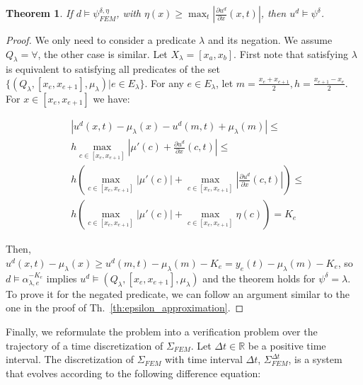 \documentclass{article}
\newtheorem{theorem}{Theorem}
\newcommand*{\R}{\mathbb{R}}
\begin{document}
\begin{theorem}
\label{th:eta_approximation}
    If $d \models \psi^{\delta, \eta}_{FEM}$, with $\eta(x) \geq \max_t |\frac{\partial
    u^d}{\partial x}(x, t)|$, then $u^d \models \psi^\delta$.
\end{theorem}
\begin{proof}
    We only need to consider a predicate $\lambda$ and its negation. We assume
    $Q_\lambda = \forall$, the other case is similar. Let $X_\lambda = [x_a,
    x_b]$. First note that satisfying $\lambda$ is equivalent to satisfying all
    predicates of the set $\{(Q_\lambda, [x_e, x_{e+1}], \mu_\lambda) | e \in
    E_\lambda\}$. For any $e \in E_\lambda$, let $m = \frac{x_e + x_{e+1}}{2}, 
    h = \frac{x_{e+1} - x_{e}}{2}$. 
    For $x \in [x_e, x_{e+1}]$ we have:

    \begin{equation}
    \begin{aligned}
        &|u^d(x, t) - \mu_\lambda(x) - u^d(m, t) + \mu_\lambda(m)| \leq \\
        &h \max_{c \in [x_e, x_{e+1}]} 
        |\mu'(c) + \frac{\partial u^d}{\partial x}(c, t)|
        \leq \\
        &h \left (  
        \max_{c \in [x_e, x_{e+1}]} |\mu'(c)| +
        \max_{c \in [x_e, x_{e+1}]} |\frac{\partial u^d}{\partial x}(c, t)|
        \right ) \leq \\
        &h \left (  
        \max_{c \in [x_e, x_{e+1}]} |\mu'(c)| +
        \max_{c \in [x_e, x_{e+1}]} \eta(c)
        \right )  = K_e
    \end{aligned}
    \end{equation}

    Then, $u^d(x, t) - \mu_\lambda(x) \geq u^d(m, t) - \mu_\lambda(m) - K_e =
    y_e(t) - \mu_\lambda(m) - K_e$, so $d \models \alpha^{-K_e}_{\lambda, e}$
    implies $u^d \models (Q_\lambda, [x_e, x_{e+1}], \mu_\lambda)$ and the
    theorem holds for $\psi^\delta = \lambda$. To prove it for the negated
    predicate, we can follow an argument similar to the one in the proof of
    Th.~\ref{th:epsilon_approximation}.
\end{proof}

Finally, we reformulate the problem into a verification problem over the
trajectory of a time discretization of $\Sigma_{FEM}$. Let $\Delta t \in \R$ be
a positive time interval. The discretization of $\Sigma_{FEM}$ with time
interval $\Delta t$, $\Sigma^{\Delta t}_{FEM}$, is a system that evolves
according to the following difference equation:
\end{document}
